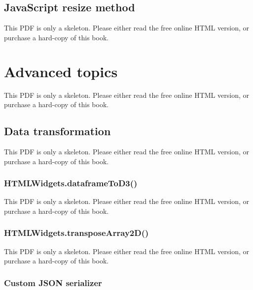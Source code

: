 \documentclass[
  11pt,
]{krantz}
\theoremstyle{definition}
\theoremstyle{definition}
\theoremstyle{definition}
\theoremstyle{definition}
\theoremstyle{remark}
\begin{document}
\begin{table}\caption{\label{tab:sizing-policy} Options that can be specified within a sizing policy.}\end{table}

\subsection{JavaScript resize method}\label{javascript-resize-method}

This PDF is only a skeleton. Please either read the free online HTML version, or purchase a hard-copy of this book.

\section{Advanced topics}\label{htmlwidgets-advanced}

This PDF is only a skeleton. Please either read the free online HTML version, or purchase a hard-copy of this book.

\subsection{Data transformation}\label{data-transformation}

This PDF is only a skeleton. Please either read the free online HTML version, or purchase a hard-copy of this book.

\subsubsection{HTMLWidgets.dataframeToD3()}\label{htmlwidgets.dataframetod3}

This PDF is only a skeleton. Please either read the free online HTML version, or purchase a hard-copy of this book.

\subsubsection{HTMLWidgets.transposeArray2D()}\label{htmlwidgets.transposearray2d}

This PDF is only a skeleton. Please either read the free online HTML version, or purchase a hard-copy of this book.

\subsubsection{Custom JSON serializer}\label{custom-json-serializer}
\end{document}
